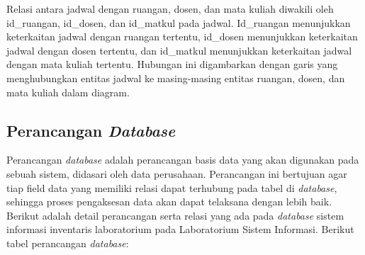 Relasi antara jadwal dengan ruangan, dosen, dan mata kuliah diwakili oleh id\_ruangan, id\_dosen, dan id\_matkul pada jadwal. Id\_ruangan menunjukkan keterkaitan jadwal dengan ruangan tertentu, id\_dosen menunjukkan keterkaitan jadwal dengan dosen tertentu, dan id\_matkul menunjukkan keterkaitan jadwal dengan mata kuliah tertentu. Hubungan ini digambarkan dengan garis yang menghubungkan entitas jadwal ke masing-masing entitas ruangan, dosen, dan mata kuliah dalam diagram.

\subsection{Perancangan \textit{Database}}
Perancangan \textit{database} adalah perancangan basis data yang akan digunakan pada sebuah sistem, didasari oleh data perusahaan. Perancangan ini bertujuan agar tiap field data yang memiliki relasi dapat terhubung pada tabel di \textit{database}, sehingga proses pengaksesan data akan dapat telaksana dengan lebih baik. Berikut adalah detail perancangan serta relasi yang ada pada \textit{database} sistem informasi inventaris laboratorium pada Laboratorium Sistem Informasi. Berikut tabel perancangan \textit{database}:

